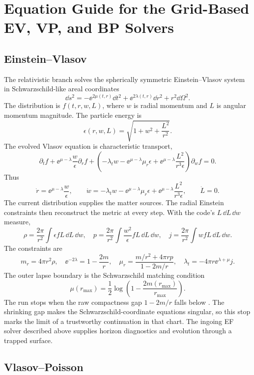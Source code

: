 \section{Equation Guide for the Grid-Based EV, VP, and BP Solvers}

\ifvenusfullcpu
\subsection{Einstein--Vlasov}

The relativistic branch solves the spherically symmetric Einstein--Vlasov
system in Schwarzschild-like areal coordinates
\[
  \dd s^2=-\ee^{2\mu(t,r)}\dd t^2+\ee^{2\lambda(t,r)}\dd r^2+r^2\dd\Omega^2 .
\]
The distribution is \(f(t,r,w,L)\), where \(w\) is radial momentum and \(L\)
is angular momentum magnitude.  The particle energy is
\[
  \epsilon(r,w,L)=\sqrt{1+w^2+\frac{L^2}{r^2}}.
\]
The evolved Vlasov equation is characteristic transport,
\[
  \partial_t f
  +\ee^{\mu-\lambda}\frac{w}{\epsilon}\partial_r f
  +\left(
      -\lambda_t w-\ee^{\mu-\lambda}\mu_r\epsilon
      +\ee^{\mu-\lambda}\frac{L^2}{r^3\epsilon}
    \right)\partial_w f=0 .
\]
Thus
\[
  \dot r=\ee^{\mu-\lambda}\frac{w}{\epsilon},\qquad
  \dot w=-\lambda_t w-\ee^{\mu-\lambda}\mu_r\epsilon
      +\ee^{\mu-\lambda}\frac{L^2}{r^3\epsilon},\qquad
  \dot L=0 .
\]
The current distribution supplies the matter sources.  The radial Einstein
constraints then reconstruct the metric at every step.  With the code's
\(L\,\dd L\,\dd w\) measure,
\[
  \rho=\frac{2\pi}{r^2}\int\epsilon fL\,\dd L\,\dd w,\quad
  p=\frac{2\pi}{r^2}\int\frac{w^2}{\epsilon}fL\,\dd L\,\dd w,\quad
  j=\frac{2\pi}{r^2}\int w fL\,\dd L\,\dd w .
\]
The constraints are
\[
  m_r=4\pi r^2\rho,\quad
  \ee^{-2\lambda}=1-\frac{2m}{r},\quad
  \mu_r=\frac{m/r^2+4\pi r p}{1-2m/r},\quad
  \lambda_t=-4\pi r\ee^{\lambda+\mu}j .
\]
The outer lapse boundary is the Schwarzschild matching condition
\[
  \mu(r_{\max})=\frac12\log\left(1-\frac{2m(r_{\max})}{r_{\max}}\right).
\]
The run stops when the raw compactness gap \(1-2m/r\) falls below
.  The shrinking gap makes the Schwarzschild-coordinate
equations singular, so this stop marks the limit of a trustworthy continuation
in that chart.  The ingoing EF solver described above supplies horizon
diagnostics and evolution through a trapped surface.
\fi

\subsection{Vlasov--Poisson}

